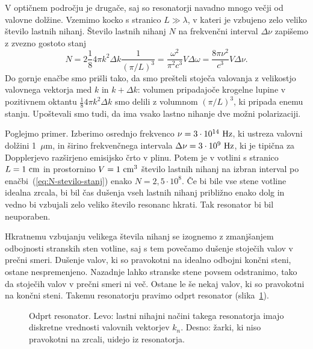 V optičnem področju je drugače, saj so resonatorji navadno mnogo večji
od valovne dolžine. Vzemimo kocko s stranico $L\gg \lambda$, 
v kateri je vzbujeno zelo veliko število lastnih nihanj. Število lastnih nihanj $N$ 
na frekvenčni interval $\Delta \nu$ zapišemo z zvezno gostoto stanj
\begin{equation}
N=2 \frac{1}{8} 4\pi k^{2}\Delta k \frac{1}{(\pi/L)^3}=\frac{\omega^{2}}{\pi^{2}c^{3}}V\Delta\omega=
\frac{8\pi \nu^{2}}{c^{3}}V\Delta\nu.
\label{eq:N-stevilo-stanj}
\end{equation}
Do gornje enačbe smo prišli tako, da smo prešteli stoječa valovanja z velikostjo
valovnega vektorja med $k$ in $k+\Delta k$: volumen pripadajoče krogelne lupine v pozitivnem oktantu
$\frac{1}{8} 4\pi k^{2}\Delta k$ smo delili z volumnom $(\pi/L)^3$, ki pripada enemu stanju. 
Upoštevali smo tudi, da ima vsako lastno nihanje dve možni polarizaciji.

Poglejmo primer. Izberimo osrednjo frekvenco $\nu=3\cdot10^{14}~\hertz$, ki
ustreza valovni dolžini 1~$\mu$m, in širino frekvenčnega
intervala $\Delta\nu=3\cdot10^{9}~\hertz$, ki je tipična za Dopplerjevo
razširjeno emisijsko črto v plinu. Potem je v votlini s stranico $L=1~\centi\metre$ 
in prostornino $V=1~\centi\metre^3$ število lastnih nihanj na izbran interval 
po enačbi~(\ref{eq:N-stevilo-stanj}) enako
$N=2,5\cdot10^{8}$. Če bi bile vse stene votline idealna zrcala,
bi bil čas dušenja vseh lastnih nihanj približno enako dolg in vedno bi vzbujali
zelo veliko število resonanc hkrati. Tak resonator bi bil neuporaben.

Hkratnemu vzbujanju velikega števila nihanj se izognemo z zmanjšanjem odbojnosti
stranskih sten votline, saj s tem povečamo dušenje stoječih valov v prečni smeri.
Dušenje valov, ki so pravokotni na idealno odbojni končni steni, ostane nespremenjeno.
Nazadnje lahko stranske stene povsem odstranimo, tako da stoječih valov v prečni smeri
ni več. Ostane le še nekaj valov, ki so pravokotni na končni
steni. Takemu resonatorju pravimo odprt resonator 
(slika~\ref{fig:Odprt_resonator}).
\begin{figure}[h]
\centering
\def\svgwidth{120truemm} 

\caption{Odprt resonator. Levo: lastni nihajni načini takega resonatorja imajo 
diskretne vrednosti valovnih vektorjev $k_{n}$. Desno: žarki, ki niso pravokotni na zrcali, 
uidejo iz resonatorja.}
\label{fig:Odprt_resonator}
\end{figure}

